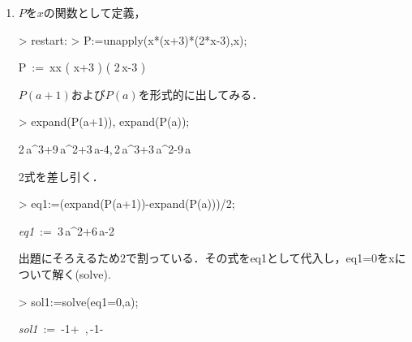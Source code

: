 \begin{enumerate}
\item
$P$を$x$の関数として定義，
\begin{MapleInput}
> restart:
> P:=unapply(x*(x+3)*(2*x-3),x);
\end{MapleInput}
\begin{MapleOutput}
P\, := \,x\mapsto x \left( x+3 \right)  \left( 2\,x-3 \right)
\end{MapleOutput}
$P(a+1)$および$P(a)$を形式的に出してみる．
\begin{MapleInput}
> expand(P(a+1)), expand(P(a));
\end{MapleInput}
\begin{MapleOutput}
2\,{a}^{3}+9\,{a}^{2}+3\,a-4,\,2\,{a}^{3}+3\,{a}^{2}-9\,a
\end{MapleOutput}
2式を差し引く．
\begin{MapleInput}
> eq1:=(expand(P(a+1))-expand(P(a)))/2;
\end{MapleInput}
\begin{MapleOutput}
{\it eq1}\, := \,3\,{a}^{2}+6\,a-2
\end{MapleOutput}
出題にそろえるため2で割っている．その式をeq1として代入し，eq1=0をxについて解く(solve).
\begin{MapleInput}
> sol1:=solve(eq1=0,a);
\end{MapleInput}
\begin{MapleOutput}
{\it sol1}\, := \,-1+\, ,\,-1-\, 
\end{MapleOutput}


\end{enumerate}
